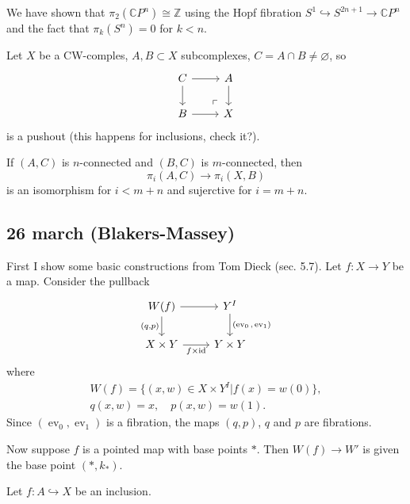 \documentclass{article}
\numberwithin{equation}{section}
\newcommand{\Z}{\mathbb{Z}}
\newcommand{\C}{\mathbb{C}}
\DeclareMathOperator{\id}{id}
\DeclareMathOperator{\ev}{ev}
\begin{document}
\begin{example}
	We have shown that $\pi_2(\C P^n)\cong\Z$ using the Hopf fibration $S^1\hookrightarrow S^{2n+1}\to\C P^n$ and the fact that $\pi_k(S^n)=0$ for $k<n$.
\end{example}
\begin{thm}
	Let $X$ be a CW-comples, $A,B\subset X$ subcomplexes, $C=A\cap B\neq\varnothing$, so
	\[\begin{tikzcd}
		C\arrow[r]\arrow[d]&A\arrow[d]\\
		B\arrow[r]&X \arrow[ul, phantom, "\ulcorner", very near start]
	\end{tikzcd}\]
	is a pushout (this happens for inclusions, {\color{orange} check it?}).
	
	If $(A,C)$ is $n$-connected and $(B,C)$ is $m$-connected, then
	\[\pi_i(A,C)\to\pi_i(X,B)\]
	is an isomorphism for $i<m+n$ and sujerctive for $i=m+n$.
\end{thm}

\subsection{26 march (Blakers-Massey)}
First I show some basic constructions from Tom Dieck (sec. 5.7). Let $f:X\to Y$ be a map. Consider the pullback
\[\begin{tikzcd}
	W(f)\arrow[r]\arrow[d,"(q\text{,}p)",swap]&Y^I\arrow[d,"(\ev_0\text{,}\ev_1)"]\\
	X\times Y\arrow[r,"f\times\id",swap]&Y\times Y
\end{tikzcd}\]
where
\begin{gather*}
	W(f)=\{(x,w)\in X\times Y^I|f(x)=w(0)\},\\
	q(x,w)=x,\quad p(x,w)=w(1).
\end{gather*}
Since $(\ev_0,\ev_1)$ is a fibration, the maps $(q,p)$, $q$ and $p$ are fibrations.

Now suppose $f$ is a pointed map with base points $*$. Then $W(f)\to W'$ is given the base point $(*,k_*)$.

Let $f:A\hookrightarrow X$ be an inclusion.
\end{document}
